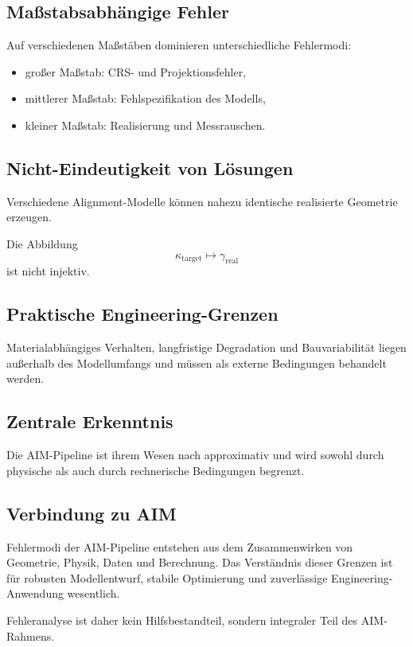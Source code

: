 \subsection{Maßstabsabhängige Fehler}
Auf verschiedenen Maßstäben dominieren unterschiedliche Fehlermodi:
\begin{itemize}
\item großer Maßstab: CRS- und Projektionsfehler,
\item mittlerer Maßstab: Fehlspezifikation des Modells,
\item kleiner Maßstab: Realisierung und Messrauschen.
\end{itemize}

\subsection{Nicht-Eindeutigkeit von Lösungen}
Verschiedene Alignment-Modelle können nahezu identische realisierte Geometrie
erzeugen.
\begin{proposition}
Die Abbildung
\[
\kappa_{\mathrm{target}}\mapsto\gamma_{\mathrm{real}}
\]
ist nicht injektiv.
\end{proposition}

\subsection{Praktische Engineering-Grenzen}
Materialabhängiges Verhalten, langfristige Degradation und Bauvariabilität
liegen außerhalb des Modellumfangs und müssen als externe Bedingungen
behandelt werden.

\subsection{Zentrale Erkenntnis}
\begin{proposition}
Die AIM-Pipeline ist ihrem Wesen nach approximativ und wird sowohl durch
physische als auch durch rechnerische Bedingungen begrenzt.
\end{proposition}

\subsection{Verbindung zu AIM}
\begin{summary}
Fehlermodi der AIM-Pipeline entstehen aus dem Zusammenwirken von Geometrie,
Physik, Daten und Berechnung. Das Verständnis dieser Grenzen ist für robusten
Modellentwurf, stabile Optimierung und zuverlässige Engineering-Anwendung
wesentlich.

Fehleranalyse ist daher kein Hilfsbestandteil, sondern integraler Teil des
AIM-Rahmens.
\end{summary}
